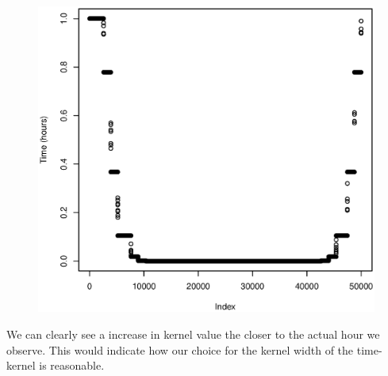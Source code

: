 \documentclass[a4paper, 12pt]{article}
\begin{document}
\begin{figure}[H]
\begin{minipage}[]{0.2\textwidth}
        \end{minipage}
        \begin{minipage}[]{0.2\textwidth}
            \includegraphics[width=\textwidth]{share/11_time.eps}
        \end{minipage}
    \end{figure}

    We can clearly see a increase in kernel value the closer to the actual hour we observe. This would indicate how our choice for the kernel width of the time-kernel is reasonable.
\end{document}
